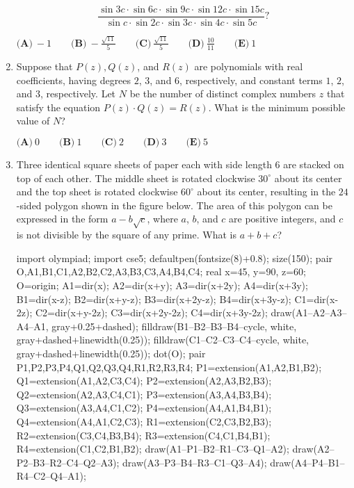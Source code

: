 \documentclass{article}
\begin{document}
\begin{enumerate}[label=\arabic*., itemsep=0.5em]
\begin{equation*}
\frac{\sin 3c \cdot \sin 6c \cdot \sin 9c \cdot \sin 12c \cdot \sin 15c}{\sin c \cdot \sin 2c \cdot \sin 3c \cdot \sin 4c \cdot \sin 5c}?
\end{equation*}


\(\textbf{(A)}\ {-}1 \qquad\textbf{(B)}\ {-}\frac{\sqrt{11}}{5} \qquad\textbf{(C)}\ \frac{\sqrt{11}}{5} \qquad\textbf{(D)}\
\frac{10}{11} \qquad\textbf{(E)}\ 1\)\par \vspace{0.5em}\item Suppose that \(P(z), Q(z)\), and \(R(z)\) are polynomials with real coefficients, having degrees \(2\), \(3\), and \(6\), respectively, and constant terms \(1\), \(2\), and \(3\), respectively. Let \(N\) be the number of distinct complex numbers \(z\) that satisfy the equation \(P(z) \cdot Q(z)=R(z)\). What is the minimum possible value of \(N\)?

\(\textbf{(A)}\: 0\qquad\textbf{(B)} \: 1\qquad\textbf{(C)} \: 2\qquad\textbf{(D)} \: 3\qquad\textbf{(E)} \: 5\)\par \vspace{0.5em}\item Three identical square sheets of paper each with side length \(6\) are stacked on top of each other. The middle sheet is rotated clockwise \(30^\circ\) about its center and the top sheet is rotated clockwise \(60^\circ\) about its center, resulting in the \(24\)-sided polygon shown in the figure below. The area of this polygon can be expressed in the form \(a-b\sqrt{c}\), where \(a\), \(b\), and \(c\) are positive integers, and \(c\) is not divisible by the square of any prime. What is \(a+b+c\)?
\begin{center}
\begin{center}
\begin{asy}
import olympiad;
import cse5;
defaultpen(fontsize(8)+0.8); size(150);
pair O,A1,B1,C1,A2,B2,C2,A3,B3,C3,A4,B4,C4;
real x=45, y=90, z=60; O=origin; 
A1=dir(x); A2=dir(x+y); A3=dir(x+2y); A4=dir(x+3y);
B1=dir(x-z); B2=dir(x+y-z); B3=dir(x+2y-z); B4=dir(x+3y-z);
C1=dir(x-2z); C2=dir(x+y-2z); C3=dir(x+2y-2z); C4=dir(x+3y-2z);
draw(A1--A2--A3--A4--A1, gray+0.25+dashed);
filldraw(B1--B2--B3--B4--cycle, white, gray+dashed+linewidth(0.25));
filldraw(C1--C2--C3--C4--cycle, white, gray+dashed+linewidth(0.25));
dot(O);
pair P1,P2,P3,P4,Q1,Q2,Q3,Q4,R1,R2,R3,R4;
P1=extension(A1,A2,B1,B2); Q1=extension(A1,A2,C3,C4); 
P2=extension(A2,A3,B2,B3); Q2=extension(A2,A3,C4,C1); 
P3=extension(A3,A4,B3,B4); Q3=extension(A3,A4,C1,C2); 
P4=extension(A4,A1,B4,B1); Q4=extension(A4,A1,C2,C3); 
R1=extension(C2,C3,B2,B3); R2=extension(C3,C4,B3,B4); 
R3=extension(C4,C1,B4,B1); R4=extension(C1,C2,B1,B2);
draw(A1--P1--B2--R1--C3--Q1--A2);
draw(A2--P2--B3--R2--C4--Q2--A3);
draw(A3--P3--B4--R3--C1--Q3--A4);
draw(A4--P4--B1--R4--C2--Q4--A1);
\end{asy}
\end{center}
\end{center}


\end{enumerate}
\end{document}
